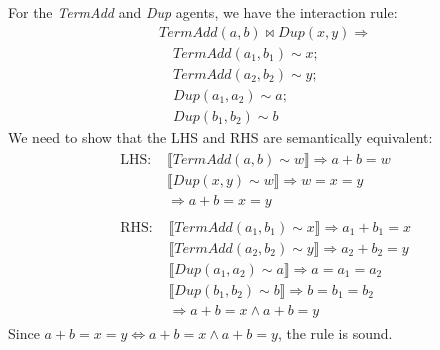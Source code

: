 \begin{lemma}
	For the \textit{TermAdd} and \textit{Dup} agents, we have the interaction rule:
	$$
	\begin{aligned}
		& \mathit{TermAdd}(a, b) \bowtie \mathit{Dup}(x, y) \Rightarrow \\
		& \quad \mathit{TermAdd}(a_1, b_1) \sim x; \\
		& \quad \mathit{TermAdd}(a_2, b_2) \sim y; \\
		& \quad \mathit{Dup}(a_1, a_2) \sim a; \\
		& \quad \mathit{Dup}(b_1, b_2) \sim b
	\end{aligned}
	$$
	We need to show that the LHS and RHS are semantically equivalent:
	$$
	\begin{aligned}
		& \begin{aligned}
			\text{LHS: } & \llbracket \mathit{TermAdd}(a, b) \sim w \rrbracket \Rightarrow a + b = w \\
			& \llbracket \mathit{Dup}(x, y) \sim w \rrbracket \Rightarrow w = x = y \\
			& \Rightarrow a + b = x = y
		\end{aligned} \\
		& \begin{aligned}
			\text{RHS: } & \llbracket \mathit{TermAdd}(a_1, b_1) \sim x \rrbracket \Rightarrow a_1 + b_1 = x \\
			& \llbracket \mathit{TermAdd}(a_2, b_2) \sim y \rrbracket \Rightarrow a_2 + b_2 = y \\
			& \llbracket \mathit{Dup}(a_1, a_2) \sim a \rrbracket \Rightarrow a = a_1 = a_2 \\
			& \llbracket \mathit{Dup}(b_1, b_2) \sim b \rrbracket \Rightarrow b = b_1 = b_2 \\
			& \Rightarrow a + b = x \land a + b = y
		\end{aligned}
	\end{aligned}
	$$
	Since $a + b = x = y \iff a + b = x \land a + b = y$, the rule is sound.
\end{lemma}

